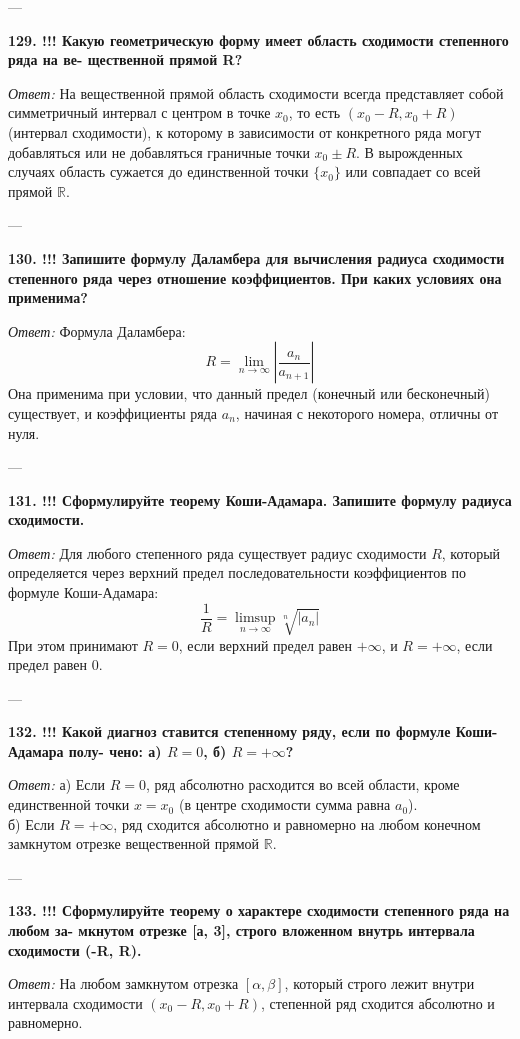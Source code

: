 \documentclass{article}
\begin{document}
---

\textbf{129. !!! Какую геометрическую форму имеет область сходимости степенного ряда на ве- щественной прямой R?}

\textit{Ответ:} На вещественной прямой область сходимости всегда представляет собой симметричный интервал с центром в точке $x_0$, то есть $(x_0 - R, x_0 + R)$ (интервал сходимости), к которому в зависимости от конкретного ряда могут добавляться или не добавляться граничные точки $x_0 \pm R$. В вырожденных случаях область сужается до единственной точки $\{x_0\}$ или совпадает со всей прямой $\mathbb{R}$.

---

\textbf{130. !!! Запишите формулу Даламбера для вычисления радиуса сходимости степенного ряда через отношение коэффициентов. При каких условиях она применима?}

\textit{Ответ:} Формула Даламбера:
$$ R = \lim_{n \to \infty} \left| \frac{a_n}{a_{n+1}} \right| $$
Она применима при условии, что данный предел (конечный или бесконечный) существует, и коэффициенты ряда $a_n$, начиная с некоторого номера, отличны от нуля.

---

\textbf{131. !!! Сформулируйте теорему Коши-Адамара. Запишите формулу радиуса сходимости.}

\textit{Ответ:} Для любого степенного ряда существует радиус сходимости $R$, который определяется через верхний предел последовательности коэффициентов по формуле Коши-Адамара:
$$ \frac{1}{R} = \limsup_{n \to \infty} \sqrt[n]{|a_n|} $$
При этом принимают $R = 0$, если верхний предел равен $+\infty$, и $R = +\infty$, если предел равен $0$.

---

\textbf{132. !!! Какой диагноз ставится степенному ряду, если по формуле Коши-Адамара полу- чено: а) $R=0$, б) $R=+\infty$?}

\textit{Ответ:}
а) Если $R=0$, ряд абсолютно расходится во всей области, кроме единственной точки $x = x_0$ (в центре сходимости сумма равна $a_0$). \\
б) Если $R=+\infty$, ряд сходится абсолютно и равномерно на любом конечном замкнутом отрезке вещественной прямой $\mathbb{R}$.

---

\textbf{133. !!! Сформулируйте теорему о характере сходимости степенного ряда на любом за- мкнутом отрезке [а, 3], строго вложенном внутрь интервала сходимости (-R, R).}

\textit{Ответ:} На любом замкнутом отрезка $[\alpha, \beta]$, который строго лежит внутри интервала сходимости $(x_0 - R, x_0 + R)$, степенной ряд сходится абсолютно и равномерно.
\end{document}
